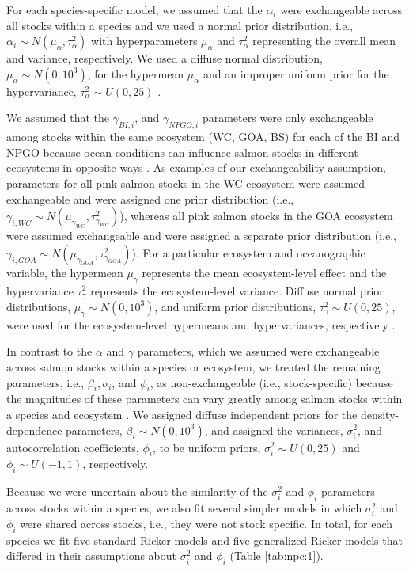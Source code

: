 For each species-specific model, we assumed that the \(\alpha_i\) were
exchangeable across all stocks within a species and we used a normal prior
distribution, i.e., \(\alpha_i \sim N(\mu_{\alpha}, \tau^2_{\alpha})\) with
hyperparameters \(\mu_{\alpha}\) and \(\tau^2_{\alpha}\) representing the
overall mean and variance, respectively. We used a diffuse normal distribution,
\(\mu_{\alpha} \sim N(0, 10^3)\), for the hypermean \(\mu_{\alpha}\) and an
improper uniform prior for the hypervariance, \(\tau^2_{\alpha} \sim U(0, 25)\)
\citep{Gelman2006}.

We assumed that the \(\gamma_{BI,i}\), and \(\gamma_{NPGO,i}\) parameters were
only exchangeable among stocks within the same ecosystem (WC, GOA, BS) for each
of the BI and NPGO because ocean conditions can influence salmon stocks in
different ecosystems in opposite ways \citep{Mueter2002a, Malick2015a}. As
examples of our exchangeability assumption, parameters for all pink salmon
stocks in the WC ecosystem were assumed exchangeable and were assigned one prior
distribution (i.e., \(\gamma_{i,WC} \sim N(\mu_{\gamma_{WC}},
\tau^2_{\gamma_{WC}})\)), whereas all pink salmon stocks in the GOA ecosystem
were assumed exchangeable and were assigned a separate prior distribution (i.e.,
\(\gamma_{i,GOA} \sim N(\mu_{\gamma_{GOA}}, \tau^2_{\gamma_{GOA}})\)). For a
particular ecosystem and oceanographic variable, the hypermean \(\mu_{\gamma}\)
represents the mean ecosystem-level effect and the hypervariance
\(\tau^2_{\gamma}\) represents the ecosystem-level variance. Diffuse normal
prior distributions, \(\mu_{\gamma} \sim N(0, 10^3)\), and uniform prior
distributions, \(\tau^2_{\gamma} \sim U(0, 25)\), were used for the
ecosystem-level hypermeans and hypervariances, respectively \citep{Gelman2006}.

In contrast to the \(\alpha\) and \(\gamma\) parameters, which we assumed were
exchangeable across salmon stocks within a species or ecosystem, we treated the
remaining parameters, i.e., \(\beta_i, \sigma_i\), and \(\phi_i\), as
non-exchangeable (i.e., stock-specific) because the magnitudes of these
parameters can vary greatly among salmon stocks within a species and ecosystem
\citep{Mueter2002a, Malick2015a, Su2004a}. We assigned diffuse independent
priors for the density-dependence parameters, \(\beta_i \sim N(0, 10^3)\), and
assigned the variances, \(\sigma_i^2\), and autocorrelation coefficients,
\(\phi_i\), to be uniform priors, \(\sigma_i^2 \sim U(0, 25)\) and \(\phi_i \sim
U(-1, 1)\), respectively.

Because we were uncertain about the similarity of the \(\sigma_i^2\) and
\(\phi_i\) parameters across stocks within a species, we also fit several
simpler models in which \(\sigma_i^2\) and \(\phi_i\) were shared across stocks,
i.e., they were not stock specific. In total, for each species we fit five
standard Ricker models and five generalized Ricker models that differed in their
assumptions about \(\sigma_i^2\) and \(\phi_i\) (Table \ref{tab:npc:1}).


